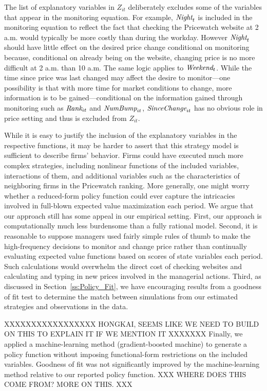 \documentclass[11pt]{article}
\newcommand{\SinceChange}{\mbox{\it SinceChange}}
\newcommand{\Rank}{\mbox{\it Rank}}
\newcommand{\NumBump}{\mbox{\it NumBump}}
\newcommand{\Night}{\mbox{\it Night}}
\newcommand{\Weekend}{\mbox{\it Weekend}}
\begin{document}
\begin{spacing}{1.3}
The list of explanatory variables in $Z_{it}$ deliberately excludes
some of the variables that appear in the monitoring equation. For
example, $\Night_t$ is included in the monitoring equation to reflect
the fact that checking the Pricewatch website at 2 a.m. would
typically be more costly than during the workday. However $\Night_t$
should have little effect on the desired price change conditional on
monitoring because, conditional on already being on the website,
changing price is no more difficult at 2 a.m. than 10 a.m. The same
logic applies to $\Weekend_t$. While the time since price was last
changed may affect the desire to monitor---one possibility is that
with more time for market conditions to change, more information is to
be gained---conditional on the information gained through monitoring
such as $\Rank_{it}$ and $\NumBump_{it}$, $\SinceChange_{it}$ has no
obvious role in price setting and thus is excluded from $Z_{it}$.

While it is easy to justify the inclusion of the explanatory variables
in the respective functions, it may be harder to assert that this
strategy model is sufficient to describe firms' behavior. Firms could
have executed much more complex strategies, including nonlinear
functions of the included variables, interactions of them, and
additional variables such as the characteristics of neighboring firms
in the Pricewatch ranking. More generally, one might worry whether a
reduced-form policy function could ever capture the intricacies
involved in full-blown expected value maximization each period.  We
argue that our approach still has some appeal in our empirical
setting. First, our approach is computationally much less burdensome
than a fully rational model. Second, it is reasonable to suppose
managers used fairly simple rules of thumb to make the high-frequency
decisions to monitor and change price rather than continually
evaluating expected value functions based on scores of state variables
each period. Such calculations would overwhelm the direct cost of
checking websites and calculating and typing in new prices involved in
the managerial actions.  Third, as discussed in
Section~\ref{ss:Policy_Fit}, we have encouraging results from a
goodness of fit test to determine the match between simulations from
our estimated strategies and observations in the data. 

XXXXXXXXXXXXXXXXX HONGKAI, SEEMS LIKE WE NEED TO BUILD ON THIS TO EXPLAIN IT IF WE MENTION IT XXXXXXX
Finally, we
applied a machine-learning method (gradient-boosted machine) to
generate a policy function without imposing functional-form
restrictions on the included variables. Goodness of fit was not
significantly improved by the machine-learning method relative to our
reported policy function. XXX WHERE DOES THIS COME FROM? MORE ON
THIS. XXX


\end{spacing}
\end{document}

